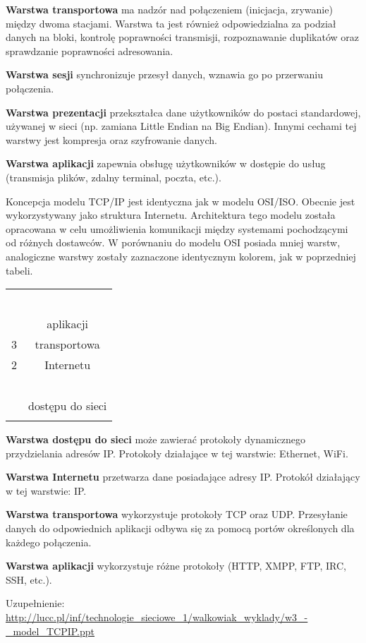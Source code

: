 \textbf{Warstwa transportowa} ma nadzór nad połączeniem (inicjacja, zrywanie) między dwoma stacjami. Warstwa ta jest również odpowiedzialna za podział danych na bloki, kontrolę poprawności transmisji, rozpoznawanie duplikatów oraz sprawdzanie poprawności adresowania.

\textbf{Warstwa sesji} synchronizuje przesył danych, wznawia go po przerwaniu połączenia.

\textbf{Warstwa prezentacji} przekształca dane użytkowników do postaci standardowej, używanej w sieci (np. zamiana Little Endian na Big Endian). Innymi cechami tej warstwy jest kompresja oraz szyfrowanie danych.

\textbf{Warstwa aplikacji} zapewnia obsługę użytkowników w dostępie do usług (transmisja plików, zdalny terminal, poczta, etc.).

Koncepcja modelu TCP/IP jest identyczna jak w modelu OSI/ISO. Obecnie jest wykorzystywany jako struktura Internetu. Architektura tego modelu została opracowana w celu umożliwienia komunikacji między systemami pochodzącymi od różnych dostawców. W porównaniu do modelu OSI posiada mniej warstw, analogiczne warstwy zostały zaznaczone identycznym kolorem, jak w poprzedniej tabeli.

\begin{table}[H]
\centering
\begin{tabular}{c|c|} \hhline{~-}
\multirow{3}{*}{4} & \cellcolor{blue!20}    \\ \hhline{~~}
~ & \cellcolor{blue!20}  \\ \hhline{~~}
~ & \multirow{-3}{*}{\cellcolor{blue!20}aplikacji}  \\ \hhline{~-}
3 & \cellcolor{red!20}transportowa \\ \hhline{~-}
2 & \cellcolor{green!20}Internetu     \\ \hhline{~-}
\multirow{2}{*}{1} & \cellcolor{yellow!20}~ \\ \hhline{~~}
~ & \multirow{-2}{*}{\cellcolor{yellow!20}dostępu do sieci}     \\ \hhline{~-}
\end{tabular}
\end{table}

\textbf{Warstwa dostępu do sieci} może zawierać protokoły dynamicznego przydzielania adresów IP. Protokoły działające w tej warstwie: Ethernet, WiFi.

\textbf{Warstwa Internetu} przetwarza dane posiadające adresy IP. Protokół działający w tej warstwie: IP.

\textbf{Warstwa transportowa} wykorzystuje protokoły TCP oraz UDP. Przesyłanie danych do odpowiednich aplikacji odbywa się za pomocą portów określonych dla każdego połączenia.

\textbf{Warstwa aplikacji} wykorzystuje różne protokoły (HTTP, XMPP, FTP, IRC, SSH, etc.).

Uzupełnienie: \url{http://lucc.pl/inf/technologie_sieciowe_1/walkowiak_wyklady/w3_-_model_TCPIP.ppt}

